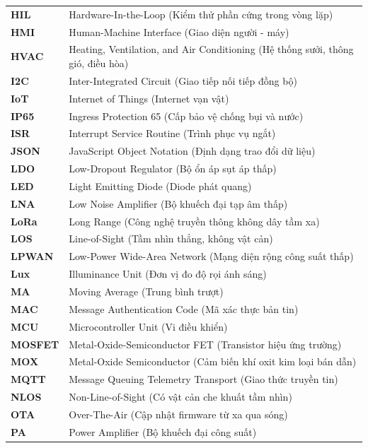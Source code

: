 \begin{longtable}{@{} p{} p{} @{}}
\textbf{HIL}    & Hardware-In-the-Loop (Kiểm thử phần cứng trong vòng lặp) \\
\textbf{HMI}    & Human-Machine Interface (Giao diện người - máy) \\
\textbf{HVAC}   & Heating, Ventilation, and Air Conditioning (Hệ thống sưởi, thông gió, điều hòa) \\
\textbf{I2C}    & Inter-Integrated Circuit (Giao tiếp nối tiếp đồng bộ) \\
\textbf{IoT}    & Internet of Things (Internet vạn vật) \\
\textbf{IP65}   & Ingress Protection 65 (Cấp bảo vệ chống bụi và nước) \\
\textbf{ISR}    & Interrupt Service Routine (Trình phục vụ ngắt) \\
\textbf{JSON}   & JavaScript Object Notation (Định dạng trao đổi dữ liệu) \\
\textbf{LDO}    & Low-Dropout Regulator (Bộ ổn áp sụt áp thấp) \\
\textbf{LED}    & Light Emitting Diode (Diode phát quang) \\
\textbf{LNA}    & Low Noise Amplifier (Bộ khuếch đại tạp âm thấp) \\
\textbf{LoRa}   & Long Range (Công nghệ truyền thông không dây tầm xa) \\
\textbf{LOS}    & Line-of-Sight (Tầm nhìn thẳng, không vật cản) \\
\textbf{LPWAN}  & Low-Power Wide-Area Network (Mạng diện rộng công suất thấp) \\
\textbf{Lux}    & Illuminance Unit (Đơn vị đo độ rọi ánh sáng) \\
\textbf{MA}     & Moving Average (Trung bình trượt) \\
\textbf{MAC}    & Message Authentication Code (Mã xác thực bản tin) \\
\textbf{MCU}    & Microcontroller Unit (Vi điều khiển) \\
\textbf{MOSFET} & Metal-Oxide-Semiconductor FET (Transistor hiệu ứng trường) \\
\textbf{MOX}    & Metal-Oxide Semiconductor (Cảm biến khí oxit kim loại bán dẫn) \\
\textbf{MQTT}   & Message Queuing Telemetry Transport (Giao thức truyền tin) \\
\textbf{NLOS}   & Non-Line-of-Sight (Có vật cản che khuất tầm nhìn) \\
\textbf{OTA}    & Over-The-Air (Cập nhật firmware từ xa qua sóng) \\
\textbf{PA}     & Power Amplifier (Bộ khuếch đại công suất) \\

\end{longtable}
